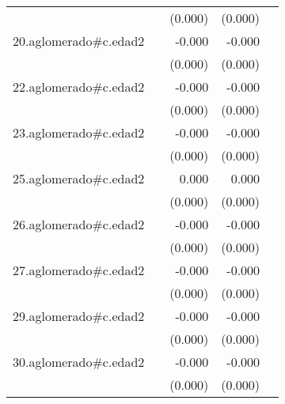 {\begin{longtable}{l*{4}{D{.}{.}{-1}}}
            &                     &     (0.000)         &     (0.000)         &                     \\
\addlinespace
20.aglomerado#c.edad2&                     &      -0.000         &      -0.000         &                     \\
            &                     &     (0.000)         &     (0.000)         &                     \\
\addlinespace
22.aglomerado#c.edad2&                     &      -0.000         &      -0.000         &                     \\
            &                     &     (0.000)         &     (0.000)         &                     \\
\addlinespace
23.aglomerado#c.edad2&                     &      -0.000         &      -0.000         &                     \\
            &                     &     (0.000)         &     (0.000)         &                     \\
\addlinespace
25.aglomerado#c.edad2&                     &       0.000         &       0.000         &                     \\
            &                     &     (0.000)         &     (0.000)         &                     \\
\addlinespace
26.aglomerado#c.edad2&                     &      -0.000         &      -0.000         &                     \\
            &                     &     (0.000)         &     (0.000)         &                     \\
\addlinespace
27.aglomerado#c.edad2&                     &      -0.000         &      -0.000         &                     \\
            &                     &     (0.000)         &     (0.000)         &                     \\
\addlinespace
29.aglomerado#c.edad2&                     &      -0.000         &      -0.000         &                     \\
            &                     &     (0.000)         &     (0.000)         &                     \\
\addlinespace
30.aglomerado#c.edad2&                     &      -0.000         &      -0.000\sym{*}  &                     \\
            &                     &     (0.000)         &     (0.000)         &                     \\

\end{longtable}}
